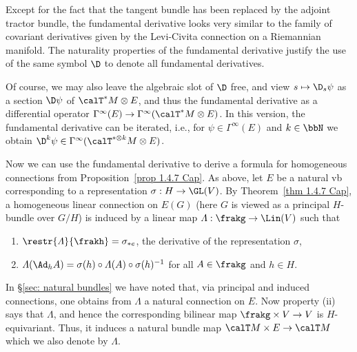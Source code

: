 Except for the fact that the tangent bundle has been replaced by the adjoint tractor bundle, the fundamental derivative looks very similar to the family of covariant derivatives given by the Levi-Civita connection on a Riemannian manifold. The naturality properties of the fundamental derivative justify the use of the same symbol $\D$ to denote all fundamental derivatives.

Of course, we may also leave the algebraic slot of $\D$ free, and view $s\mapsto \D_s \psi$ as a section $\D \psi$ of $\calT^\ast M\otimes E$, and thus the fundamental derivative as a differential operator $\Gamma^\infty(E)\to \Gamma^\infty(\calT^\ast M\otimes E)$. In this version, the fundamental derivative can be iterated, i.e., for $\psi\in\Gamma^\infty(E)$ and $k\in\bbN$ we obtain $\D^k\psi\in\Gamma^\infty(\calT^{\ast\otimes k} M\otimes E)$.

Now we can use the fundamental derivative to derive a formula for homogeneous connections from Proposition~\ref{prop 1.4.7 Cap}. As above, let $E$ be a natural \gls{vb} corresponding to a representation $\sigma:H\to \GL(V)$. By Theorem~\ref{thm 1.4.7 Cap}, a homogeneous linear connection on $E(G)$ (here $G$ is viewed as a principal $H$-bundle over $G\slash H$) is induced by a linear map $\varLambda:\frakg\to \Lin(V)$ such that 
\begin{enumerate}[label=(\roman*)]
    \item $\restr{\varLambda}{\frakh}=\sigma_{\ast e}$, the derivative of the representation $\sigma$,
    \item $\varLambda(\Ad_h A)=\sigma(h)\circ \varLambda(A)\circ \sigma(h)^{-1}$ for all $A\in\frakg$ and $h\in H$.
\end{enumerate}
 In \S\ref{sec: natural bundles} we have noted that, via principal and induced connections, one obtains from $\varLambda$ a natural connection on $E$. Now property (ii) says that $\varLambda$, and hence the corresponding bilinear map $\frakg\times V\to V$ is $H$-equivariant. Thus, it induces a natural bundle map $\calT M\times E\to \calT M$ which we also denote by $\varLambda$.


